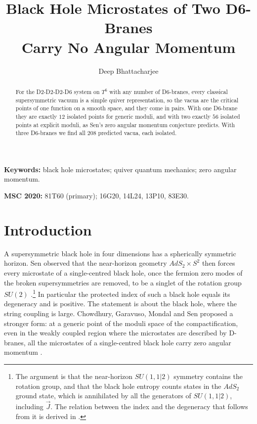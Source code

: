 \documentclass[11pt]{amsart}
\theoremstyle{definition}
\begin{document}
\title[Zero angular momentum of D-brane microstates]{Black Hole Microstates of Two D6-Branes\\ Carry No Angular Momentum}

\author{Deep Bhattacharjee}
\address{Formerly, Electro-Gravitational Space Propulsion Laboratory (EGSPL), Bhubaneswar, Odisha 751030, India}
\address{Formerly, University of Calcutta (Heramba Chandra College), 23/49 Gariahat Road, Golpark, Kolkata 700029, West Bengal, India}

\begin{abstract}
For the D2-D2-D2-D6 system on $T^6$ with any number of D6-branes, every classical supersymmetric vacuum is a simple quiver representation, so the vacua are the critical points of one function on a smooth space, and they come in pairs. With one D6-brane they are exactly $12$ isolated points for generic moduli, and with two exactly $56$ isolated points at explicit moduli, as Sen's zero angular momentum conjecture predicts. With three D6-branes we find all $208$ predicted vacua, each isolated.
\end{abstract}

\maketitle
\enlargethispage{4pt}

\noindent\textbf{Keywords:} black hole microstates; quiver quantum mechanics; zero angular momentum.

\smallskip\noindent\textbf{MSC 2020:} 81T60 (primary); 16G20, 14L24, 13P10, 83E30.

\section{Introduction}\label{sec:intro}

A supersymmetric black hole in four dimensions has a spherically symmetric horizon. Sen observed that the near-horizon geometry $AdS_2\times S^2$ then forces every microstate of a single-centred black hole, once the fermion zero modes of the broken supersymmetries are removed, to be a singlet of the rotation group $SU(2)$ \cite{Sen11,DGMS11}.\footnote{The argument is that the near-horizon $SU(1,1|2)$ symmetry contains the rotation group, and that the black hole entropy counts states in the $AdS_2$ ground state, which is annihilated by all the generators of $SU(1,1|2)$, including $\vec J$. The relation between the index and the degeneracy that follows from it is derived in \cite{DGMS11}.} In particular the protected index of such a black hole equals its degeneracy and is positive. The statement is about the black hole, where the string coupling is large. Chowdhury, Garavuso, Mondal and Sen proposed a stronger form: at a generic point of the moduli space of the compactification, even in the weakly coupled region where the microstates are described by D-branes, all the microstates of a single-centred black hole carry zero angular momentum \cite{CGMS14,CGMS16}.
\end{document}
